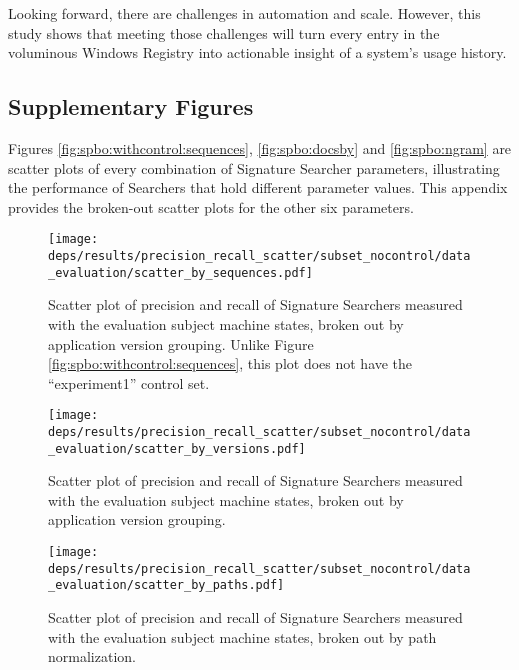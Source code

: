 \documentclass[11pt]{ucthesis}
\theoremstyle{plain}
\theoremstyle{definition}
\begin{document}
Looking forward, there are challenges in automation and scale.  However, this study shows that meeting those challenges will turn every entry in the voluminous Windows Registry into actionable insight of a system's usage history.


\begin{appendix}


\chapter{Supplementary Figures}


\label{apdx:breakouts}

Figures \ref{fig:spbo:withcontrol:sequences}, \ref{fig:spbo:docsby} and \ref{fig:spbo:ngram} are scatter plots of every combination of Signature Searcher parameters, illustrating the performance of Searchers that hold different parameter values.  This appendix provides the broken-out scatter plots for the other six parameters.

\begin{figure}
  \centering
  \texttt{[image: deps/results/precision\_recall\_scatter/subset\_nocontrol/data\_evaluation/scatter\_by\_sequences.pdf]}
  \caption{Scatter plot of precision and recall of Signature Searchers measured with the evaluation subject machine states, broken out by application version grouping.  Unlike Figure \ref{fig:spbo:withcontrol:sequences}, this plot does not have the ``experiment1'' control set.}
  \label{fig:spbo:nocontrol:sequences}
\end{figure}

\begin{figure}
  \centering
  \texttt{[image: deps/results/precision\_recall\_scatter/subset\_nocontrol/data\_evaluation/scatter\_by\_versions.pdf]}
  \caption{Scatter plot of precision and recall of Signature Searchers measured with the evaluation subject machine states, broken out by application version grouping.}
  \label{fig:spbo:versions}
\end{figure}

\begin{figure}
  \centering
  \texttt{[image: deps/results/precision\_recall\_scatter/subset\_nocontrol/data\_evaluation/scatter\_by\_paths.pdf]}
  \caption{Scatter plot of precision and recall of Signature Searchers measured with the evaluation subject machine states, broken out by path normalization.}
  \label{fig:spbo:paths}
\end{figure}


\end{appendix}
\end{document}
